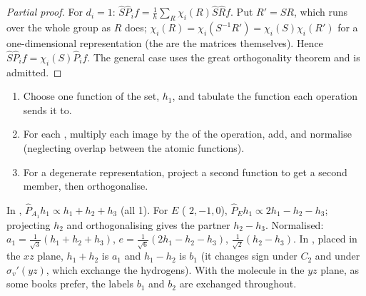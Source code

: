 \begin{proof}[Partial proof]
For $d_i = 1$: $\hat S\hat P_if = \frac1h\sum_R\chi_i(R)\hat S\hat Rf$. Put $R' = SR$,
which runs over the whole group as $R$ does; $\chi_i(R) = \chi_i(S^{-1}R') =
\chi_i(S)\chi_i(R')$ for a one-dimensional representation (the  are
the matrices themselves). Hence $\hat S\hat P_if = \chi_i(S)\hat P_if$. The general
case uses the great orthogonality theorem and is admitted.
\end{proof}

\begin{method}\label{met:b3:group-theory-applied:salc}
\begin{enumerate}
  \item Choose one function of the set, $h_1$, and tabulate the function each
        operation sends it to.
  \item For each , multiply each image by the
         of the operation, add, and normalise (neglecting overlap
        between the atomic functions).
  \item For a degenerate representation, project a second function to get
        a second member, then orthogonalise.
\end{enumerate}
\end{method}

\begin{example}\label{ex:b3:group-theory-applied:salcs}
In , $\hat P_{A_1}h_1 \propto h_1 + h_2 + h_3$ (all  1). For $E$
( $2, -1, 0$), $\hat P_Eh_1 \propto 2h_1 - h_2 - h_3$; projecting $h_2$ and
orthogonalising gives the partner $h_2 - h_3$. Normalised: $a_1 =
\frac{1}{\sqrt3}(h_1 + h_2 + h_3)$, $e = \frac{1}{\sqrt6}(2h_1 - h_2 - h_3)$,
$\frac{1}{\sqrt2}(h_2 - h_3)$. In , placed in the $xz$ plane, $h_1 + h_2$ is
$a_1$ and $h_1 - h_2$ is $b_1$ (it changes sign under $C_2$ and under $\sigma_v'(yz)$,
which exchange the hydrogens). With the molecule in the $yz$ plane, as some
books prefer, the labels $b_1$ and $b_2$ are exchanged throughout.
\end{example}

